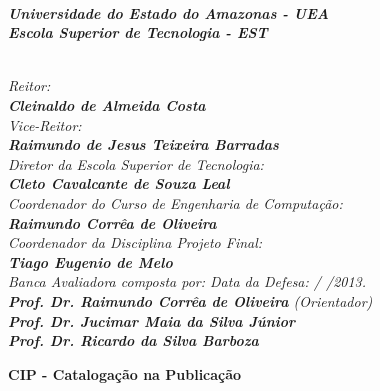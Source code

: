 \documentclass{dcctese}
\begin{document}
\newpage


\textit{\textbf{\\
Universidade do Estado do Amazonas - UEA\\
Escola Superior de Tecnologia - EST}}

\textit{\\
Reitor:\\ 
\textbf{
Cleinaldo de Almeida Costa}\\
Vice-Reitor:\\ \textbf{Raimundo de Jesus Teixeira Barradas}}
\\
\textit{
Diretor da Escola Superior de Tecnologia:\\ 
\textbf{Cleto Cavalcante de Souza Leal}}
\\
\textit{
Coordenador do Curso de Engenharia de Computa\c{c}\~{a}o:\\
\textbf{Raimundo Corr\^{e}a de Oliveira}}
\\
\textit{
Coordenador da Disciplina Projeto Final:\\
\textbf{Tiago Eugenio de Melo}}
\\[12pt]
\textit{
Banca Avaliadora composta por: \hfill Data da Defesa:  /  /2013.\\
}
\textit{ 
\textbf{Prof. Dr. Raimundo Corr\^{e}a de Oliveira} (Orientador)\\
\textbf{Prof. Dr. Jucimar Maia da Silva J\'{u}nior}\\%
\textbf{Prof. Dr. Ricardo da Silva Barboza}
}

\begin{center}\large \bf CIP - Cataloga\c{c}\~{a}o na Publica\c{c}\~{a}o\end{center}\\
\begin{center}
\end{center}
\end{document}
